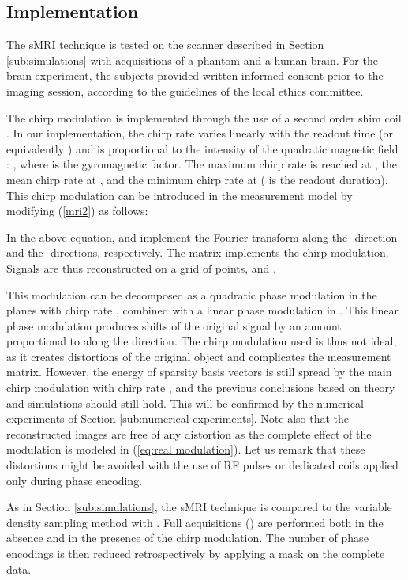 \documentclass[10pt,draftcls, onecolumn]{IEEEtran}
\begin{document}
\subsection{Implementation}
The sMRI technique is tested on the  scanner described in Section \ref{sub:simulations} with  acquisitions of a phantom and a human brain. For the brain experiment, the subjects provided written informed consent prior to the imaging session, according to the guidelines of the local ethics committee.

The chirp modulation is implemented through the use of a second order shim coil . In our implementation, the chirp rate varies linearly with the readout time  (or equivalently ) and is proportional to the intensity of the quadratic magnetic field : , where  is the gyromagnetic factor. The maximum chirp rate  is reached at , the mean chirp rate  at , and the minimum chirp rate  at  ( is the readout duration). This chirp modulation can be introduced in the measurement model by modifying (\ref{mri2}) as follows:

In the above equation,  and  implement the Fourier transform along the -direction and the -directions, respectively. The matrix  implements the chirp modulation. Signals are thus reconstructed on a grid of  points, and .

This modulation can be decomposed as a quadratic phase modulation in the  planes with chirp rate , combined with a linear phase modulation in . This linear phase modulation produces shifts of the original signal by an amount proportional to  along the  direction. The chirp modulation used is thus not ideal, as it creates distortions of the original object and complicates the measurement matrix. However, the energy of sparsity basis vectors is still spread by the main chirp modulation with chirp rate , and the previous conclusions based on theory and simulations should still hold. This will be confirmed by the numerical experiments of Section \ref{sub:numerical experiments}. Note also that the reconstructed images are free of any distortion as the complete effect of the modulation is modeled in (\ref{eq:real modulation}). Let us remark that these distortions might be avoided with the use of RF pulses or dedicated coils applied only during phase encoding.

As in Section \ref{sub:simulations}, the sMRI technique is compared to the variable density sampling method with . Full acquisitions () are performed both in the absence and in the presence of the chirp modulation. The number of phase encodings  is then reduced retrospectively by applying a mask on the complete data.
\end{document}
